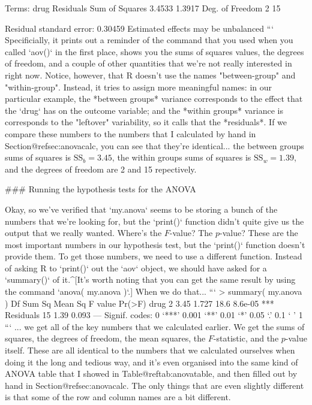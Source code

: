 Terms:
                  drug Residuals
Sum of Squares  3.4533    1.3917
Deg. of Freedom      2        15

Residual standard error: 0.30459 
Estimated effects may be unbalanced
```
Specificially, it prints out a reminder of the command that you used when you called `aov()` in the first place, shows you the sums of squares values, the degrees of freedom, and a couple of other quantities that we're not really interested in right now. Notice, however, that R doesn't use the names "between-group" and "within-group". Instead, it tries to assign more meaningful names: in our particular example, the *between groups* variance corresponds to the effect that the `drug` has on the outcome variable; and the *within groups* variance is corresponds to the "leftover" variability, so it calls that the *residuals*. If we compare these numbers to the numbers that I calculated by hand in Section@refsec:anovacalc, you can see that they're identical... the between groups sums of squares is $\mbox{SS}_b = 3.45$, the within groups sums of squares is $\mbox{SS}_w = 1.39$, and the degrees of freedom are 2 and 15 repectively. 

### Running the hypothesis tests for the ANOVA

Okay, so we've verified that `my.anova` seems to be storing a bunch of the numbers that we're looking for, but the `print()` function didn't quite give us the output that we really wanted. Where's the $F$-value? The $p$-value? These are the most important numbers in our hypothesis test, but the `print()` function doesn't provide them. To get those numbers, we need to use a different function. Instead of asking R to `print()` out the `aov` object, we should have asked for a `summary()` of it.^[It's worth noting that you can get the same result by using the command `anova( my.anova )`.] When we do that...
```
> summary( my.anova )
            Df Sum Sq Mean Sq F value  Pr(>F)    
drug         2   3.45   1.727    18.6 8.6e-05 ***
Residuals   15   1.39   0.093                       
---
Signif. codes:  0 ‘***’ 0.001 ‘**’ 0.01 ‘*’ 0.05 ‘.’ 0.1 ‘ ’ 1 
```
... we get all of the key numbers that we calculated earlier. We get the sums of squares, the degrees of freedom, the mean squares, the $F$-statistic, and the $p$-value itself. These are all identical to the numbers that we calculated ourselves when doing it the long and tedious way, and it's even organised into the same kind of ANOVA table that I showed in Table@reftab:anovatable, and then filled out by hand in Section@refsec:anovacalc. The only things that are even slightly different is that some of the row and column names are a bit different.



